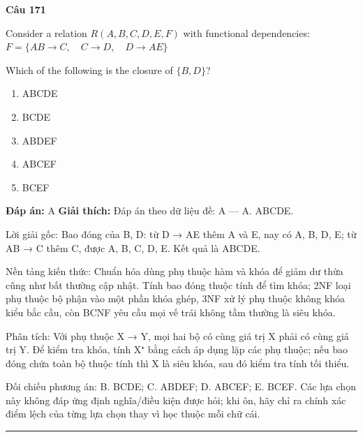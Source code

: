 \documentclass[11pt,a4paper]{article}
\newenvironment{question}[1]{%
  \par\vspace{1em}\noindent\textbf{\large Câu #1}\par\vspace{0.4em}
}{%
  \par\vspace{1em}\hrule\vspace{0.6em}
}
\newenvironment{choices}{%
  \begin{enumerate}[label=\textbf{\Alph*.},leftmargin=2.2em,itemsep=2pt,topsep=3pt]
}{%
  \end{enumerate}
}
\newcommand{\choice}{\item}
\begin{document}
\begin{question}{171}
Consider a relation \(R(A, B, C, D, E, F)\) with functional dependencies:
\(F = \{ AB \rightarrow C, \quad C \rightarrow D, \quad D \rightarrow AE \}\)

Which of the following is the closure of \(\{B, D\}\)?
\begin{choices}
\choice ABCDE
\choice BCDE
\choice ABDEF
\choice ABCEF
\choice BCEF
\end{choices}
\textbf{Đáp án:} A
\textbf{Giải thích:} Đáp án theo dữ liệu đề: A — A. {ABCDE}.

Lời giải gốc: Bao đóng của {B, D}: từ D → AE thêm A và E, nay có {A, B, D, E}; từ AB → C thêm C, được {A, B, C, D, E}. Kết quả là {ABCDE}.

Nền tảng kiến thức: Chuẩn hóa dùng phụ thuộc hàm và khóa để giảm dư thừa cũng như bất thường cập nhật. Tính bao đóng thuộc tính để tìm khóa; 2NF loại phụ thuộc bộ phận vào một phần khóa ghép, 3NF xử lý phụ thuộc không khóa kiểu bắc cầu, còn BCNF yêu cầu mọi vế trái không tầm thường là siêu khóa.

Phân tích: Với phụ thuộc X → Y, mọi hai bộ có cùng giá trị X phải có cùng giá trị Y. Để kiểm tra khóa, tính X⁺ bằng cách áp dụng lặp các phụ thuộc; nếu bao đóng chứa toàn bộ thuộc tính thì X là siêu khóa, sau đó kiểm tra tính tối thiểu.

Đối chiếu phương án: B. {BCDE}; C. {ABDEF}; D. {ABCEF}; E. {BCEF}. Các lựa chọn này không đáp ứng định nghĩa/điều kiện được hỏi; khi ôn, hãy chỉ ra chính xác điểm lệch của từng lựa chọn thay vì học thuộc mỗi chữ cái.
\end{question}
\end{document}
